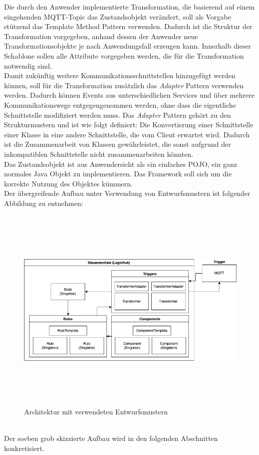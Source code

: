         \linebreak
        Die durch den Anwender implementierte Transformation, die basierend auf einem eingehenden \acs{MQTT}-Topic das Zustandsobjekt verändert, soll als Vorgabe 
        stützend das {Template Method} Pattern verwenden. Dadurch ist die Struktur der Transformation vorgegeben, anhand dessen der Anwender neue Transformationsobjekte 
        je nach Anwendungsfall erzeugen kann. Innerhalb dieser Schablone sollen alle Attribute vorgegeben werden, die für die Transformation notwendig sind.
        \\
        \linebreak
        Damit zukünftig weitere Kommunikationsschnittstellen hinzugefügt werden können, soll für die Transformation zusätzlich das 
        \textit{Adapter} Pattern verwenden werden. Dadurch können Events aus unterschiedlichen Services und über mehrere Kommunikationswege 
        entgegengenommen werden, ohne dass die eigentliche Schnittstelle modifiziert werden muss. Das \textit{Adapter} Pattern gehört 
        zu den Strukturmustern und ist wie folgt definiert: 
        Die Konvertierung einer Schnittstelle einer Klasse in eine andere Schnittstelle, die vom Client erwartet wird. Dadurch ist die Zusammenarbeit von Klassen 
        gewährleistet, die sonst aufgrund der inkompatiblen Schnittstelle nicht zusammenarbeiten könnten. \cite{gamma1995adapter}
        \\
        Das Zustandsobjekt ist aus Anwendersicht als ein einfaches \ac{POJO}, ein ganz normales Java Objekt zu implementieren. Das Framework soll sich um die korrekte Nutzung 
        des Objektes kümmern. 
        \\
        \linebreak
        Der übergreifende Aufbau unter Verwendung von Entwurfsmustern ist folgender Abbildung zu entnehmen:
        \begin{figure}[hbt!]
            \centering
            \includegraphics[width=14cm,height=10cm,keepaspectratio]{images/final_architecture_with_patterns.png}
            \caption{Architektur mit verwendeten Entwurfsmustern}
            \label{fig:patternarchitektur}
        \end{figure}
        \\
        Der soeben grob skizzierte Aufbau wird in den folgenden Abschnitten konkretisiert.

